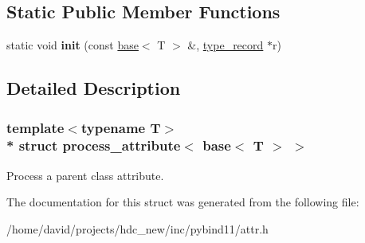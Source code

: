 \subsection*{Static Public Member Functions}
\begin{DoxyCompactItemize}
\item 
static void {\bfseries init} (const \hyperlink{structbase}{base}$<$ T $>$ \&, \hyperlink{structtype__record}{type\+\_\+record} $\ast$r)\hypertarget{structprocess__attribute_3_01base_3_01_t_01_4_01_4_ae448bc67fd8ae68058eafcf6c9476598}{}\label{structprocess__attribute_3_01base_3_01_t_01_4_01_4_ae448bc67fd8ae68058eafcf6c9476598}

\end{DoxyCompactItemize}


\subsection{Detailed Description}
\subsubsection*{template$<$typename T$>$\\*
struct process\+\_\+attribute$<$ base$<$ T $>$ $>$}

Process a parent class attribute. 

The documentation for this struct was generated from the following file\+:\begin{DoxyCompactItemize}
\item 
/home/david/projects/hdc\+\_\+new/inc/pybind11/attr.\+h\end{DoxyCompactItemize}
